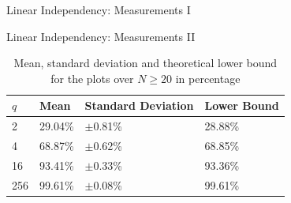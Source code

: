 \documentclass[t]{beamer} %
\begin{document}
\begin{frame}{Linear Independency: Measurements I}
\begin{figure}
  \hfill
\end{figure}
\end{frame}

\begin{frame}{Linear Independency: Measurements II}
\begin{table}[htb]
  \caption{Mean, standard deviation and theoretical lower bound for the plots over $N\ge20$ in percentage}
  \label{tab:mean-std}
  \centering
  \begin{tabular}{l|l|l|l}
    \toprule
       $q$ & Mean & Standard Deviation & Lower Bound \\
    \midrule
    2 & 29.04\% & $\pm$0.81\% & 28.88\%\\
    4 & 68.87\% & $\pm$0.62\% & 68.85\%\\
    16 & 93.41\% & $\pm$0.33\% & 93.36\%\\
    256 & 99.61\% & $\pm$0.08\% & 99.61\%\\
    \bottomrule
  \end{tabular}
\end{table}
\end{frame}
\end{document}
